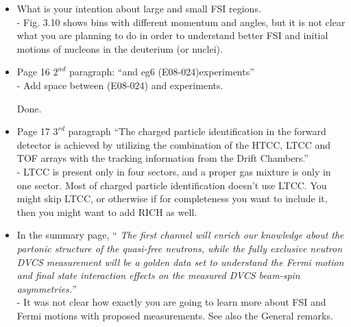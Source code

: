 \begin{itemize}
  \item What is your intention about large and small FSI regions. \\
  - Fig. 3.10 shows bins with different momentum and angles, but it is not clear what you are planning to do in order to understand better FSI and initial motions of nucleons in the deuterium (or nuclei).
  
  \item Page 16 $2^{nd}$ paragraph: ``and eg6 (E08-024)experiments'' \\
  - Add space between (E08-024) and experiments.
     
     {\color{red} Done.}
  
 \item Page 17 $3^{rd}$ paragraph ``The charged particle identification in the 
    forward detector is achieved by utilizing the combination of the HTCC, LTCC 
    and TOF arrays with the tracking information from the Drift Chambers.'' \\
- LTCC is present only in four sectors, and a proper gas mixture is only in one 
  sector. Most of charged particle identification doesn't use LTCC. You might 
  skip LTCC, or otherwise if for completeness you want to include it, then you 
  might want to add RICH as well.


\item In the summary page, ``\textit{ The first channel will enrich our 
   knowledge about the partonic structure of the quasi-free neutrons, while the 
   fully exclusive neutron DVCS measurement will be a golden data set to 
   understand the Fermi motion and final state interaction effects on the 
   measured DVCS beam-spin asymmetries.''}\\
- It was not clear how exactly you are going to learn more about FSI and Fermi motions with proposed measurements. See also the General remarks.

\end{itemize}
 


